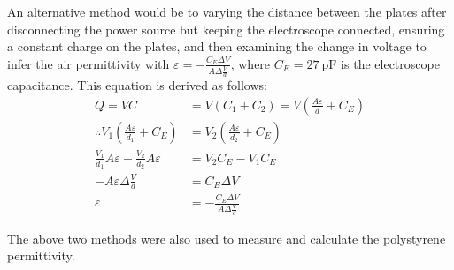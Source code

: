 \documentclass[a4paper]{scrartcl}
\begin{document}
An alternative method would be to varying the distance between the plates after disconnecting the power source but keeping the electroscope connected, ensuring a constant charge on the plates, and then examining the change in voltage to infer the air permittivity with \(\varepsilon = -\frac{C_E \Delta V}{A \Delta \frac{V}{d}}\), where \(C_E = \SI{27}{\pico\farad}\) is the electroscope capacitance. This equation is derived as follows:
\begin{align*}
    Q = V C &= V (C_1 + C_2) = V \left( \frac{A \varepsilon}{d} + C_E \right) \\
    \therefore V_1 \left( \frac{A \varepsilon}{d_1} + C_E \right) &= V_2 \left( \frac{A \varepsilon}{d_2} + C_E \right) \\
    \frac{V_1}{d_1} A \varepsilon - \frac{V_2}{d_2} A \varepsilon &= V_2 C_E - V_1 C_E \\
    -A \varepsilon \Delta \frac{V}{d} &= C_E \Delta V \\
    \varepsilon &= - \frac{C_E \Delta V}{A \Delta \frac{V}{d}}
\end{align*}

The above two methods were also used to measure and calculate the polystyrene permittivity.
\end{document}
